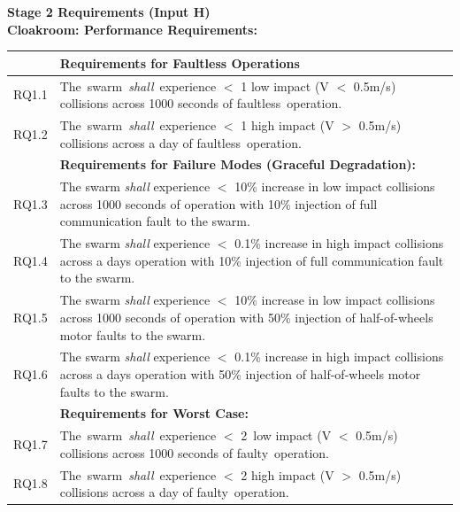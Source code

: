 \documentclass[lettersize,journal]{IEEEtran}
\begin{document}
\newpage
\noindent \textbf{Stage 2 Requirements (Input H)}\\
\noindent \textbf{Cloakroom: Performance Requirements: }
\begin{center}
	\begin{tabular}{|p{7mm}|p{72mm}|}
		\hline
		& \textbf{Requirements for Faultless Operations} \\
		\hline
		RQ1.1 & The swarm \emph{shall} experience $<$ 1 low impact (V $<$ 0.5m/s) collisions across 1000 seconds of faultless operation. \\ 
		\hline
		RQ1.2 & The swarm \emph{shall} experience $<$ 1 high impact (V $>$ 0.5m/s) collisions across a day of faultless operation. \\ 
		\hline
        & \textbf{Requirements for Failure Modes (Graceful Degradation): } \\
        \hline
		RQ1.3 & The swarm \emph{shall} experience $<$ 10\% increase in low impact collisions across 1000 seconds of operation with 10\% injection of full communication fault to the swarm. \\
		\hline
		RQ1.4 & The swarm \emph{shall} experience $<$ 0.1\% increase in high impact collisions across a days operation with 10\% injection of full communication fault to the swarm.\\ 
		\hline
		RQ1.5 & The swarm \emph{shall} experience $<$ 10\% increase in low impact collisions across 1000 seconds of operation with 50\% injection of half-of-wheels motor faults to the swarm.\\
		\hline
		RQ1.6 & The swarm \emph{shall} experience $<$ 0.1\% increase in high impact collisions across a days operation with 50\% injection of half-of-wheels motor faults to the swarm.	\\	
		\hline
	    & \textbf{Requirements for Worst Case: } \\
	    \hline
		RQ1.7 & The swarm \emph{shall} experience $<$ 2 low impact (V $<$ 0.5m/s) collisions across 1000 seconds of faulty operation. \\			\hline	
		RQ1.8 & The swarm \emph{shall} experience $<$ 2 high impact (V $>$ 0.5m/s) collisions across a day of faulty operation.  \\		[1ex] 		
		\hline
	\end{tabular}
\end{center}
\end{document}

